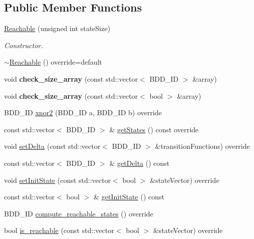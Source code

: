 \subsection*{Public Member Functions}
\begin{DoxyCompactItemize}
\item 
\hyperlink{classClassProject_1_1Reachable_ab5198f10bf77a813a7547bb5cbf72fc9}{Reachable} (unsigned int state\+Size)
\begin{DoxyCompactList}\small\item\em Constructor. \end{DoxyCompactList}\item 
\hyperlink{classClassProject_1_1Reachable_a1f39c60e57237bf1af65657f41a58c2f}{$\sim$\+Reachable} () override=default
\item 
\mbox{\label{classClassProject_1_1Reachable_aef184d12beb7264228104f04d4aef63e}} 
void {\bfseries check\+\_\+size\+\_\+array} (const std\+::vector$<$ B\+D\+D\+\_\+\+ID $>$ \&array)
\item 
\mbox{\label{classClassProject_1_1Reachable_ab1112c527e5a944129b61d9566ca6186}} 
void {\bfseries check\+\_\+size\+\_\+array} (const std\+::vector$<$ bool $>$ \&array)
\item 
B\+D\+D\+\_\+\+ID \hyperlink{classClassProject_1_1Reachable_a7f97f9868c825b64f333c4bc8eb7632b}{xnor2} (B\+D\+D\+\_\+\+ID a, B\+D\+D\+\_\+\+ID b) override
\item 
const std\+::vector$<$ B\+D\+D\+\_\+\+ID $>$ \& \hyperlink{classClassProject_1_1Reachable_a46b6aab8ea4dac374af4e2e97b5321dd}{get\+States} () const override
\item 
void \hyperlink{classClassProject_1_1Reachable_a53fdcc94c37cd7f0e27881678189b5c5}{set\+Delta} (const std\+::vector$<$ B\+D\+D\+\_\+\+ID $>$ \&transition\+Functions) override
\item 
const std\+::vector$<$ B\+D\+D\+\_\+\+ID $>$ \& \hyperlink{classClassProject_1_1Reachable_a52a7381b5237c686f47496b8c63ac37f}{get\+Delta} () const
\item 
void \hyperlink{classClassProject_1_1Reachable_ab3ddc3f569e280c3902a40ab8202f8c3}{set\+Init\+State} (const std\+::vector$<$ bool $>$ \&state\+Vector) override
\item 
const std\+::vector$<$ bool $>$ \& \hyperlink{classClassProject_1_1Reachable_a713e76e60c325f459c4561517fd832b6}{get\+Init\+State} () const
\item 
B\+D\+D\+\_\+\+ID \hyperlink{classClassProject_1_1Reachable_ab382d204af0fe91f027026b6dad6142f}{compute\+\_\+reachable\+\_\+states} () override
\item 
bool \hyperlink{classClassProject_1_1Reachable_a19a40b477fc119690e0a9f1f7ffc4843}{is\+\_\+reachable} (const std\+::vector$<$ bool $>$ \&state\+Vector) override
\end{DoxyCompactItemize}


